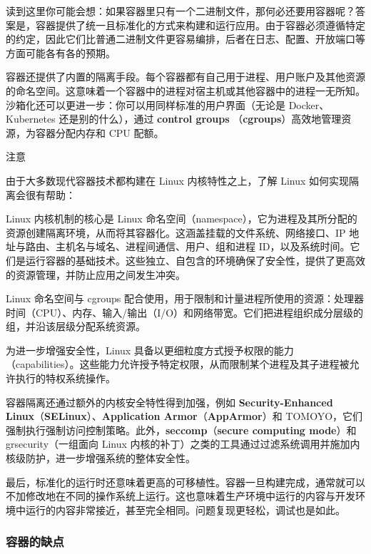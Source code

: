 读到这里你可能会想：如果容器里只有一个二进制文件，那何必还要用容器呢？答案是，容器提供了统一且标准化的方式来构建和运行应用。由于容器必须遵循特定的约定，因此它们比普通二进制文件更容易编排，后者在日志、配置、开放端口等方面可能各有各的预期。

\label{idx:1728}
容器还提供了内置的隔离手段。每个容器都有自己用于进程、用户账户及其他资源的命名空间。这意味着一个容器中的进程对宿主机或其他容器中的进程一无所知。沙箱化还可以更进一步：你可以用同样标准的用户界面（无论是 Docker、Kubernetes 还是别的什么），通过 \textbf{control groups }（\textbf{cgroups}）高效地管理资源，为容器分配内存和 CPU 配额。

\begin{myNotic}{注意}

由于大多数现代容器技术都构建在 Linux 内核特性之上，了解 Linux 如何实现隔离会很有帮助：


Linux 内核机制的核心是 Linux 命名空间（namespace），它为进程及其所分配的资源创建隔离环境，从而将其容器化。这涵盖挂载的文件系统、网络接口、IP 地址与路由、主机名与域名、进程间通信、用户、组和进程 ID，以及系统时间。它们是运行容器的基础技术。这些独立、自包含的环境确保了安全性，提供了更高效的资源管理，并防止应用之间发生冲突。

Linux 命名空间与 cgroups 配合使用，用于限制和计量进程所使用的资源：处理器时间（CPU）、内存、输入/输出（I/O）和网络带宽。它们把进程组织成分层级的组，并沿该层级分配系统资源。

为进一步增强安全性，Linux 具备以更细粒度方式授予权限的能力（capabilities）。这些能力允许授予特定权限，从而限制某个进程及其子进程被允许执行的特权系统操作。

\label{idx:1729}
\label{idx:1730}
\label{idx:1731}
容器隔离还通过额外的内核安全特性得到加强，例如 \textbf{Security-Enhanced Linux}（\textbf{SELinux}）、\textbf{Application Armor}（\textbf{AppArmor}）和 TOMOYO，它们强制执行强制访问控制策略。此外，\textbf{seccomp}（\textbf{secure computing mode}）和 grsecurity（一组面向 Linux 内核的补丁）之类的工具通过过滤系统调用并施加内核级防护，进一步增强系统的整体安全性。
\end{myNotic}

\label{idx:1732}
最后，标准化的运行时还意味着更高的可移植性。容器一旦构建完成，通常就可以不加修改地在不同的操作系统上运行。这也意味着生产环境中运行的内容与开发环境中运行的内容非常接近，甚至完全相同。问题复现更轻松，调试也是如此。

\subsubsection{容器的缺点}

